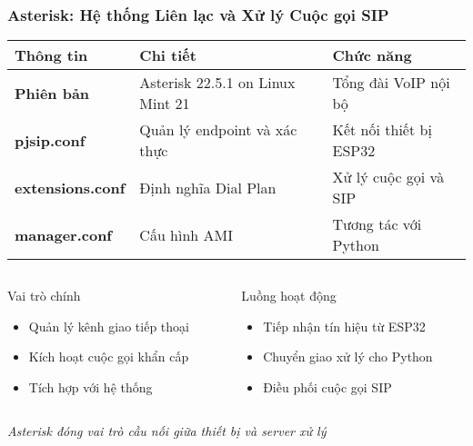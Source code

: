 \begin{frame}
\frametitle{Asterisk: Hệ thống Liên lạc và Xử lý Cuộc gọi SIP}

\begin{table}[htbp]
\centering
\footnotesize
\begin{tabular}{|p{2.5cm}|p{4cm}|p{3cm}|}
\hline
\textbf{Thông tin} & \textbf{Chi tiết} & \textbf{Chức năng} \\
\hline
\textbf{Phiên bản} & Asterisk 22.5.1 on Linux Mint 21 & Tổng đài VoIP nội bộ \\
\hline
\textbf{pjsip.conf} & Quản lý endpoint và xác thực & Kết nối thiết bị ESP32 \\
\hline
\textbf{extensions.conf} & Định nghĩa Dial Plan & Xử lý cuộc gọi và SIP \\
\hline
\textbf{manager.conf} & Cấu hình AMI & Tương tác với Python \\
\hline
\end{tabular}
\end{table}

\vspace{0.4cm}

\begin{columns}[t]
\begin{column}{0.48\textwidth}
\begin{block}{Vai trò chính}
\begin{itemize}
\item Quản lý kênh giao tiếp thoại
\item Kích hoạt cuộc gọi khẩn cấp
\item Tích hợp với hệ thống
\end{itemize}
\end{block}
\end{column}

\begin{column}{0.48\textwidth}
\begin{alertblock}{Luồng hoạt động}
\begin{itemize}
\item Tiếp nhận tín hiệu từ ESP32
\item Chuyển giao xử lý cho Python
\item Điều phối cuộc gọi SIP
\end{itemize}
\end{alertblock}
\end{column}
\end{columns}

\vspace{0.3cm}
\begin{center}
\textit{\small Asterisk đóng vai trò cầu nối giữa thiết bị và server xử lý}
\end{center}

\end{frame}
